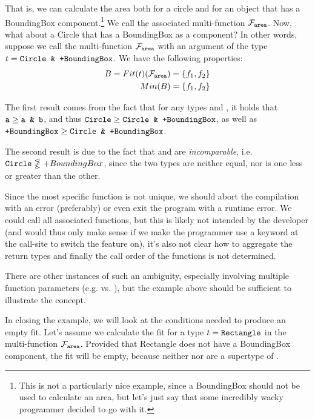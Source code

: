 \noindent That is, we can calculate the area both for a circle and for an object that has a BoundingBox component.\footnote{This is not a particularly nice example, since a BoundingBox should not be used to calculate an area, but let's just say that some incredibly wacky programmer decided to go with it.} We call the associated multi-function $\mathcal{F}_{\text{\texttt{area}}}$. Now, what about a Circle that has a BoundingBox as a component? In other words, suppose we call the multi-function $\mathcal{F}_{\text{\texttt{area}}}$ with an argument of the type $t = \texttt{Circle \& +BoundingBox}$. We have the following properties:
\begin{align*}
	B = Fit(t)(\mathcal{F}_{\text{\texttt{area}}}) &= \{ f_1, f_2 \} \\
	Min(B) &= \{ f_1, f_2 \}
\end{align*}
	
\noindent The first result comes from the fact that for any types  and , it holds that $\texttt{a} \geq \texttt{a \& b}$, and thus $\texttt{Circle} \geq \texttt{Circle \& +BoundingBox}$, as well as $\texttt{+BoundingBox} \geq \texttt{Circle \& +BoundingBox}$.
	
The second result is due to the fact that  and  are \textit{incomparable}, i.e. $\texttt{Circle} \not\lesseqgtr +BoundingBox$, since the two types are neither equal, nor is one less or greater than the other.
	
Since the most specific function is not unique, we should abort the compilation with an error (preferably) or even exit the program with a runtime error. We could call all associated functions, but this is likely not intended by the developer (and would thus only make sense if we make the programmer use a keyword at the call-site to switch the feature on), it's also not clear how to aggregate the return types and finally the call order of the functions is not determined.
	
There are other instances of such an ambiguity, especially involving multiple function parameters (e.g.  vs. ), but the example above should be sufficient to illustrate the concept.
	
\medskip
	
\noindent In closing the example, we will look at the conditions needed to produce an empty fit. Let's assume we calculate the fit for a type $t = \texttt{Rectangle}$ in the multi-function $\mathcal{F}_{\text{\texttt{area}}}$. Provided that Rectangle does not have a BoundingBox component, the fit will be empty, because neither  nor  are a supertype of .

